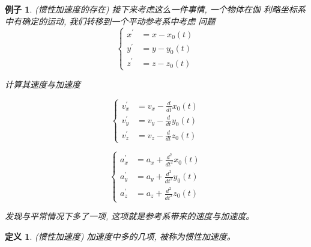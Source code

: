 \documentclass{ctexart}
\numberwithin{equation}{subsection}
\numberwithin{theorem}{subsection}
\newtheorem{definition} {定义}
\numberwithin{definition}{subsection}
\numberwithin{proof}{subsection}
\numberwithin{lemma}{subsection}
\newtheorem{example}    {例子}
\numberwithin{example}{subsection}
\numberwithin{remark}{subsection}
\numberwithin{corollary}{subsection}
\numberwithin{exercise}{subsection}
\numberwithin{problem}{subsection}
\numberwithin{question}{section}
\numberwithin{method}{subsection}
\begin{document}
    \begin{example}
        (惯性加速度的存在) 接下来考虑这么一件事情, 一个物体在伽
        利略坐标系中有确定的运动, 我们转移到一个平动参考系中考虑
        问题
        \begin{equation}
            \begin{cases}
                x ^ \prime &= x - x_0(t) \\
                y ^ \prime &= y - y_0(t) \\
                z ^ \prime &= z - z_0(t)
            \end{cases}
        \end{equation}

        计算其速度与加速度

        \begin{equation}
            \begin{cases}
                v ^ \prime _ x &= v_x - \frac{d}{dt}x_0(t) \\
                v ^ \prime _ y &= v_y - \frac{d}{dt}y_0(t) \\
                v ^ \prime _ z &= v_z - \frac{d}{dt}z_0(t)
            \end{cases}
        \end{equation}

        \begin{equation}
            \begin{cases}
                a ^ \prime _ x &= a_x + \frac{d^2}{dt^2}x_0(t) \\
                a ^ \prime _ y &= a_y + \frac{d^2}{dt^2}y_0(t) \\
                a ^ \prime _ z &= a_z + \frac{d^2}{dt^2}z_0(t)
            \end{cases}
        \end{equation}

        发现与平常情况下多了一项, 这项就是参考系带来的速度与加速度。
    \end{example}

    \begin{definition}
        \label{1.2 eq:inertial acceleration}
        (惯性加速度) 加速度中多的几项, 被称为惯性加速度。
    \end{definition}
\end{document}
